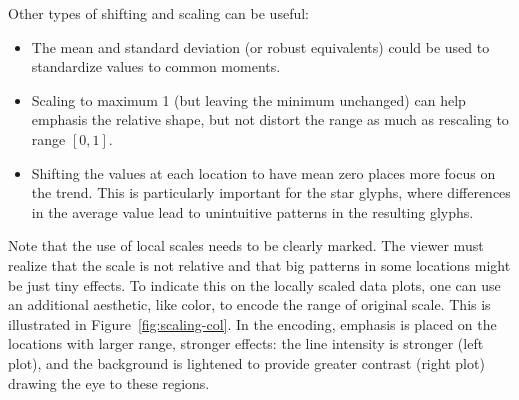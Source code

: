 \documentclass[oneside]{article}
\begin{document}
% 
% 
% 
% 

Other types of shifting and scaling can be useful:

\begin{itemize} \itemsep 0in

  \item The mean and standard deviation (or robust equivalents) could be used
  to standardize values to common moments.
  
   \item Scaling to maximum 1 (but leaving the minimum unchanged) can help
  emphasis the relative shape, but not distort the range as much as rescaling
  to range $[0, 1]$.

  \item Shifting the values at each location to have mean zero places more
  focus on the trend. This is particularly important for the star glyphs,
  where differences in the average value lead to unintuitive patterns in the
  resulting glyphs.

\end{itemize}

Note that the use of local scales needs to be clearly marked. The viewer must realize that the scale is not relative and that big patterns in some locations might be just tiny effects. To indicate this on the locally scaled data plots, one can use an additional aesthetic, like color, to encode the range of original scale. This is illustrated in Figure~\ref{fig:scaling-col}. In the encoding, emphasis is placed on the locations with larger range, stronger effects: the line intensity is stronger (left plot), and the background is lightened to provide greater contrast (right plot) drawing the eye to these regions. 
\end{document}
